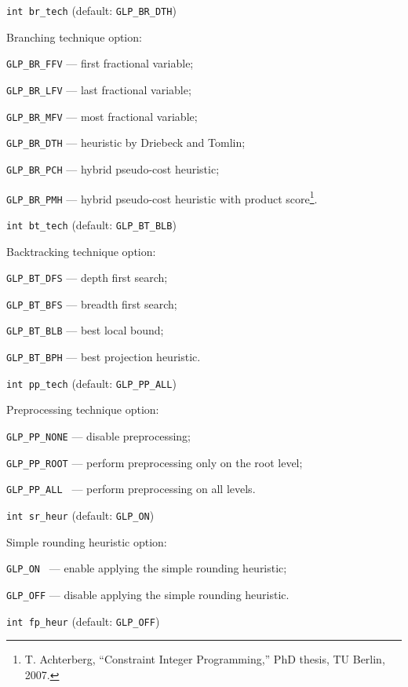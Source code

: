 {\tt int br\_tech} (default: {\tt GLP\_BR\_DTH})

Branching technique option:

\verb|GLP_BR_FFV| --- first fractional variable;

\verb|GLP_BR_LFV| --- last fractional variable;

\verb|GLP_BR_MFV| --- most fractional variable;

\verb|GLP_BR_DTH| --- heuristic by Driebeck and Tomlin;

\verb|GLP_BR_PCH| --- hybrid pseudo-cost heuristic;

\verb|GLP_BR_PMH| --- hybrid pseudo-cost heuristic with product
score\footnote{T. Achterberg, ``Constraint Integer Programming,''
PhD thesis, TU Berlin, 2007.}.

\bigskip\vspace*{-2pt}

{\tt int bt\_tech} (default: {\tt GLP\_BT\_BLB})

Backtracking technique option:

\verb|GLP_BT_DFS| --- depth first search;

\verb|GLP_BT_BFS| --- breadth first search;

\verb|GLP_BT_BLB| --- best local bound;

\verb|GLP_BT_BPH| --- best projection heuristic.

\bigskip\vspace*{-2pt}

{\tt int pp\_tech} (default: {\tt GLP\_PP\_ALL})

Preprocessing technique option:

\verb|GLP_PP_NONE| --- disable preprocessing;

\verb|GLP_PP_ROOT| --- perform preprocessing only on the root level;

\verb|GLP_PP_ALL | --- perform preprocessing on all levels.

\bigskip\vspace*{-2pt}

{\tt int sr\_heur} (default: {\tt GLP\_ON})

Simple rounding heuristic option:

\verb|GLP_ON | --- enable applying the simple rounding heuristic;

\verb|GLP_OFF| --- disable applying the simple rounding heuristic.

\newpage

{\tt int fp\_heur} (default: {\tt GLP\_OFF})

